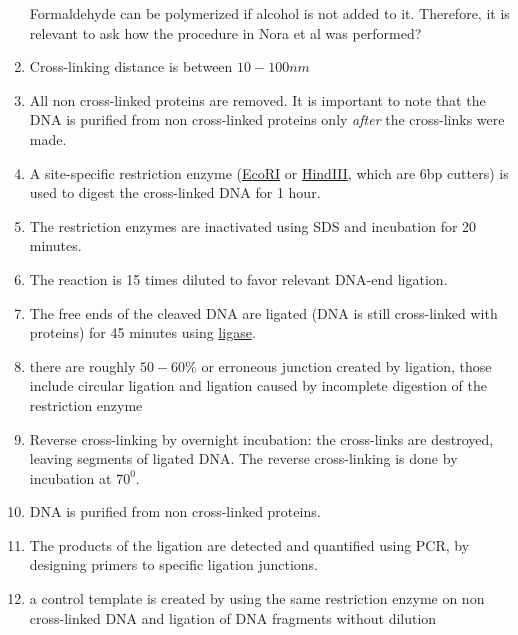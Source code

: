 \documentclass[12pt]{book}
\begin{document}
\begin{enumerate}
Formaldehyde can be polymerized if alcohol is not added to it. Therefore, it is relevant to ask how the procedure in Nora et al \cite{nora2012spatial} was performed? 
\item Cross-linking distance is between $10-100nm$ \cite{dekker2013exploring}
\item All non cross-linked proteins are removed. It is important to note that the DNA is purified from non cross-linked proteins only \textit{after} the cross-links were made.
\item A site-specific restriction enzyme (\href{http://en.wikipedia.org/wiki/EcoRI}{EcoRI} or \href{http://en.wikipedia.org/wiki/HindIII}{HindIII}, which are 6bp cutters) is used to digest the cross-linked DNA for 1 hour. 
\item The restriction enzymes are inactivated using SDS and incubation for 20 minutes.
\item The reaction is 15 times diluted to favor relevant DNA-end ligation.
\item The free ends of the cleaved DNA are ligated (DNA is still cross-linked with proteins) for 45 minutes using \href{http://en.wikipedia.org/wiki/Ligase}{ligase}.
\item there are roughly $50-60\%$ or erroneous junction created by ligation, those include circular ligation and ligation caused by incomplete digestion of the restriction enzyme
\item Reverse cross-linking by overnight incubation: the cross-links are destroyed, leaving segments of ligated DNA. The reverse cross-linking is done by incubation at $70^0$.
\item DNA is purified from non cross-linked proteins.
\item The products of the ligation are detected and quantified using PCR, by designing primers to specific ligation junctions. 
\item a control template is created by using the same restriction enzyme on non cross-linked DNA and ligation of DNA fragments without dilution
\end{enumerate}

\begin{figure}[H]
\end{figure}
\end{document}
